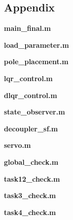 \documentclass[hyperref]{article}
\theoremstyle{nonumberplain}
\begin{document}
	\begin{appendices}
		
		\section{Appendix}
		
		\textbf{\textcolor[rgb]{0.98,0.00,0.00}{main\_final.m}}
		
		
		\textbf{\textcolor[rgb]{0.98,0.00,0.00}{load\_parameter.m}}
		
		
		\textbf{\textcolor[rgb]{0.98,0.00,0.00}{pole\_placement.m}}
		
		
		\textbf{\textcolor[rgb]{0.98,0.00,0.00}{lqr\_control.m}}
		
		
		\textbf{\textcolor[rgb]{0.98,0.00,0.00}{dlqr\_control.m}}
		
		
		\textbf{\textcolor[rgb]{0.98,0.00,0.00}{state\_observer.m}}
		
		
		\textbf{\textcolor[rgb]{0.98,0.00,0.00}{decoupler\_sf.m}}
		
		
		\textbf{\textcolor[rgb]{0.98,0.00,0.00}{servo.m}}
		
		
		\textbf{\textcolor[rgb]{0.98,0.00,0.00}{global\_check.m}}
		
		
		\textbf{\textcolor[rgb]{0.98,0.00,0.00}{task12\_check.m}}
		
		
		\textbf{\textcolor[rgb]{0.98,0.00,0.00}{task3\_check.m}}
		
		
		\textbf{\textcolor[rgb]{0.98,0.00,0.00}{task4\_check.m}}
		
		
		
	\end{appendices}
	
\end{document}
